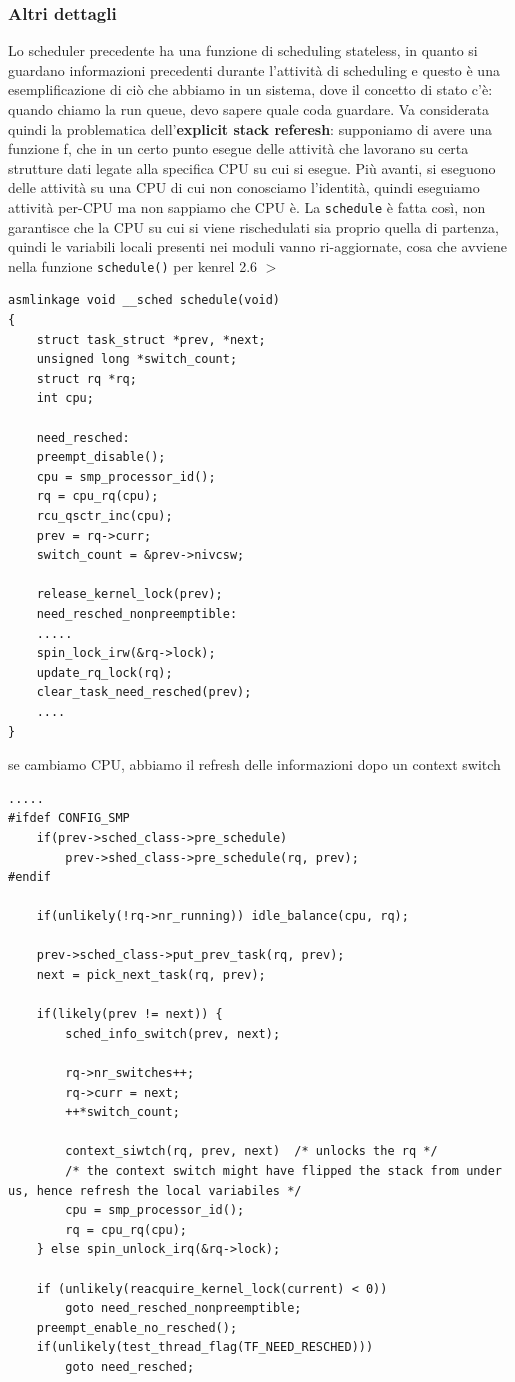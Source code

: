 \documentclass[12pt, oneside]{extbook}
\begin{document}
\subsubsection{Altri dettagli}
Lo scheduler precedente ha una funzione di scheduling stateless, in quanto si guardano informazioni precedenti durante l'attività di scheduling e questo è una esemplificazione di ciò che abbiamo in un sistema, dove il concetto di stato c'è: quando chiamo la run queue, devo sapere quale coda guardare. Va considerata quindi la problematica dell'\textbf{explicit stack referesh}: supponiamo di avere una funzione f, che in un certo punto esegue delle attività che lavorano su certa strutture dati legate alla specifica CPU su cui si esegue. Più avanti, si eseguono delle attività su una CPU di cui non conosciamo l'identità, quindi eseguiamo attività per-CPU ma non sappiamo che CPU è. La \texttt{schedule} è fatta così, non garantisce che la CPU su cui si viene rischedulati sia proprio quella di partenza, quindi le variabili locali presenti nei moduli vanno ri-aggiornate, cosa che avviene nella funzione \texttt{schedule()} per kenrel 2.6 $>$
\begin{lstlisting}
asmlinkage void __sched schedule(void)
{
	struct task_struct *prev, *next;
	unsigned long *switch_count;
	struct rq *rq;
	int cpu;
	
	need_resched:
	preempt_disable();
	cpu = smp_processor_id();
	rq = cpu_rq(cpu);
	rcu_qsctr_inc(cpu);
	prev = rq->curr;
	switch_count = &prev->nivcsw;
		
	release_kernel_lock(prev);
	need_resched_nonpreemptible:
	.....
	spin_lock_irw(&rq->lock);
	update_rq_lock(rq);
	clear_task_need_resched(prev);
	....			
}
\end{lstlisting}
se cambiamo CPU, abbiamo il refresh delle informazioni dopo un context switch
\begin{lstlisting}
.....
#ifdef CONFIG_SMP
	if(prev->sched_class->pre_schedule)
		prev->shed_class->pre_schedule(rq, prev);
#endif

	if(unlikely(!rq->nr_running)) idle_balance(cpu, rq);
	
	prev->sched_class->put_prev_task(rq, prev);
	next = pick_next_task(rq, prev);
	
	if(likely(prev != next)) {
		sched_info_switch(prev, next);
		
		rq->nr_switches++;
		rq->curr = next;
		++*switch_count;
		
		context_siwtch(rq, prev, next)	/* unlocks the rq */
		/* the context switch might have flipped the stack from under us, hence refresh the local variabiles */
		cpu = smp_processor_id();
		rq = cpu_rq(cpu);	
	} else spin_unlock_irq(&rq->lock);

	if (unlikely(reacquire_kernel_lock(current) < 0))
		goto need_resched_nonpreemptible;
	preempt_enable_no_resched();
	if(unlikely(test_thread_flag(TF_NEED_RESCHED)))
		goto need_resched;
\end{lstlisting}
\end{document}
